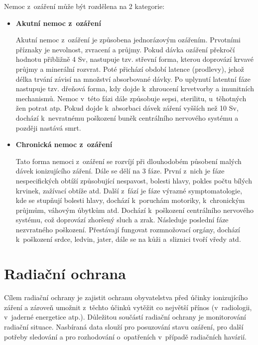 Nemoc z~ozáření může být rozdělena na 2 kategorie: \cite{nemoc}

\begin{itemize}
	\item \textbf{Akutní nemoc z~ozáření}
	
		Akutní nemoc z~ozáření je způsobena jednorázovým
ozářením. Prvotními příznaky je nevolnost, zvracení a průjmy. Pokud
dávka ozáření překročí hodnotu přibližně 4 Sv, nastupuje tzv. střevní
forma, kterou doprovází krvavé průjmy a mine\-rální rozvrat. Poté
přichází období latence (prodlevy), jehož délka trvání závisí na
množství absorbované dávky. Po uplynutí latentní fáze nastupuje
tzv. dřeňová forma, kdy dojde k~zhroucení krvetvorby a imunitních
mechanismů. Nemoc v~této fázi dále způsobuje sepsi, sterilitu,
u~těhotných žen potrat atp. Pokud dojde k~absorbaci dávek záření
vyšších než 10 Sv, dochází k~nevratnému poškození buněk centrálního
nervového systému a později nastává smrt.
		
	\item \textbf{Chronická nemoc z~ozáření}
	
		Tato forma nemoci z~ozáření se rozvíjí při dlouhodobém
působení malých dávek ionizujícího záření. Dále se dělí na 3
fáze. První z~nich je fáze nespecifických obtíží způsobující
nespavost, bolesti hlavy, pokles počtu bílých krvinek, zažívací obtíže
atd. Další z~fází je fáze výrazné symptomatologie, kde se stupňují
bolesti hlavy, dochází k~poruchám motoriky, k~chronickým průjmům,
váhovým úbytkům atd. Dochází k~poškození centrálního nervového
systému, což doprovází zhoršený sluch a zrak. Následuje poslední fáze
nezvratného poškození. Přestávají fungovat rozmnožovací orgány,
dochází k~poškození srdce, ledvin, jater, dále se na kůži a~sliznici
tvoří vředy atd.

\end{itemize}

\section{Radiační ochrana} Cílem radiační ochrany je zajistit ochranu
obyvatelstva před účinky ionizujícího záření a zároveň umožnit
z~těchto účinků vytěžit co největší přínos (v~radiologii, v~jaderné
energetice atp.). Důležitou součástí radiační ochrany je monitorování
radiační situace. Nasbíraná data slouží pro posuzování stavu ozáření,
pro další potřeby sledování a pro rozhodování o~opatřeních v~případě
radiačních havárií. \cite{suroRadOch} \cite{sujbRadSit}

